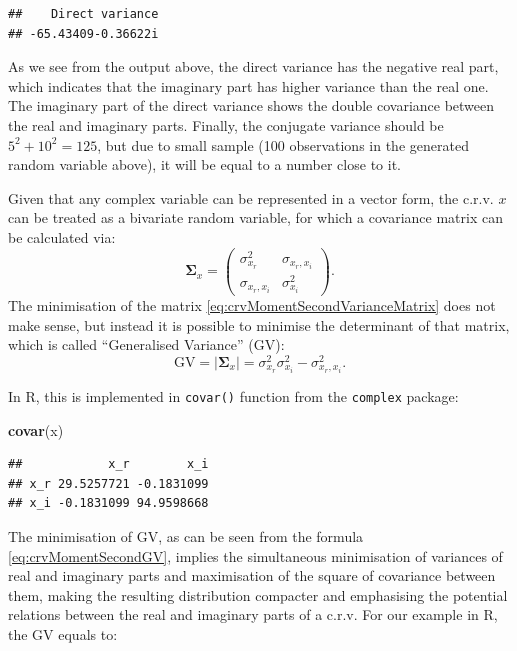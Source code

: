 \documentclass[
]{book}
\newenvironment{Shaded}{\begin{snugshade}}{\end{snugshade}}
\newcommand{\KeywordTok}[1]{\textcolor[rgb]{0.13,0.29,0.53}{\textbf{#1}}}
\newcommand{\NormalTok}[1]{#1}
\begin{document}
\begin{verbatim}
##    Direct variance 
## -65.43409-0.36622i
\end{verbatim}

As we see from the output above, the direct variance has the negative real part, which indicates that the imaginary part has higher variance than the real one. The imaginary part of the direct variance shows the double covariance between the real and imaginary parts. Finally, the conjugate variance should be \(5^2 + 10^2 = 125\), but due to small sample (100 observations in the generated random variable above), it will be equal to a number close to it.

Given that any complex variable can be represented in a vector form, the c.r.v. \(x\) can be treated as a bivariate random variable, for which a covariance matrix can be calculated via:
\begin{equation}
    \boldsymbol{\Sigma}_x = \begin{pmatrix} \sigma_{x_r}^2 & \sigma_{x_r, x_i} \\ \sigma_{x_r, x_i} & \sigma_{x_i}^2 \end{pmatrix} .
    \label{eq:crvMomentSecondVarianceMatrix}
\end{equation}
The minimisation of the matrix \eqref{eq:crvMomentSecondVarianceMatrix} does not make sense, but instead it is possible to minimise the determinant of that matrix, which is called ``Generalised Variance'' (GV):
\begin{equation}
    \mathrm{GV} = |\boldsymbol{\Sigma}_x| = \sigma_{x_r}^2 \sigma_{x_i}^2 - \sigma_{x_r, x_i}^2 .
    \label{eq:crvMomentSecondGV}
\end{equation}

In R, this is implemented in \texttt{covar()} function from the \texttt{complex} package:

\begin{Shaded}
\begin{Highlighting}[]
\KeywordTok{covar}\NormalTok{(x)}
\end{Highlighting}
\end{Shaded}

\begin{verbatim}
##            x_r        x_i
## x_r 29.5257721 -0.1831099
## x_i -0.1831099 94.9598668
\end{verbatim}

The minimisation of GV, as can be seen from the formula \eqref{eq:crvMomentSecondGV}, implies the simultaneous minimisation of variances of real and imaginary parts and maximisation of the square of covariance between them, making the resulting distribution compacter and emphasising the potential relations between the real and imaginary parts of a c.r.v. For our example in R, the GV equals to:
\end{document}
